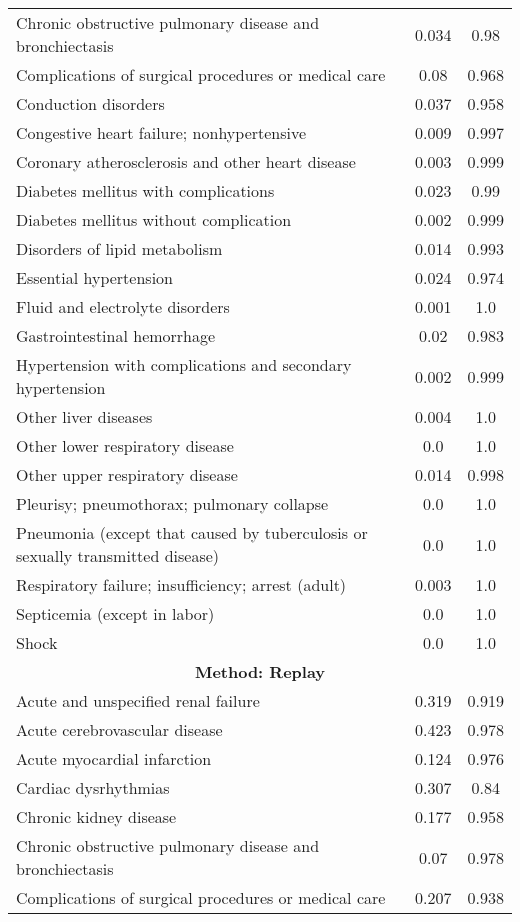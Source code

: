 \documentclass{article}
\begin{document}
\begin{longtable}{lcc}
Chronic obstructive pulmonary disease and bronchiectasis & 0.034 & 0.98 \\
Complications of surgical procedures or medical care & 0.08 & 0.968 \\
Conduction disorders & 0.037 & 0.958 \\
Congestive heart failure; nonhypertensive & 0.009 & 0.997 \\
Coronary atherosclerosis and other heart disease & 0.003 & 0.999 \\
Diabetes mellitus with complications & 0.023 & 0.99 \\
Diabetes mellitus without complication & 0.002 & 0.999 \\
Disorders of lipid metabolism & 0.014 & 0.993 \\
Essential hypertension & 0.024 & 0.974 \\
Fluid and electrolyte disorders & 0.001 & 1.0 \\
Gastrointestinal hemorrhage & 0.02 & 0.983 \\
Hypertension with complications and secondary hypertension & 0.002 & 0.999 \\
Other liver diseases & 0.004 & 1.0 \\
Other lower respiratory disease & 0.0 & 1.0 \\
Other upper respiratory disease & 0.014 & 0.998 \\
Pleurisy; pneumothorax; pulmonary collapse & 0.0 & 1.0 \\
Pneumonia (except that caused by tuberculosis or sexually transmitted disease) & 0.0 & 1.0 \\
Respiratory failure; insufficiency; arrest (adult) & 0.003 & 1.0 \\
Septicemia (except in labor) & 0.0 & 1.0 \\
Shock & 0.0 & 1.0 \\
\midrule
\multicolumn{3}{c}{\textbf{Method: Replay}} \\
\midrule
Acute and unspecified renal failure & 0.319 & 0.919 \\
Acute cerebrovascular disease & 0.423 & 0.978 \\
Acute myocardial infarction & 0.124 & 0.976 \\
Cardiac dysrhythmias & 0.307 & 0.84 \\
Chronic kidney disease & 0.177 & 0.958 \\
Chronic obstructive pulmonary disease and bronchiectasis & 0.07 & 0.978 \\
Complications of surgical procedures or medical care & 0.207 & 0.938 \\

\end{longtable}
\end{document}
